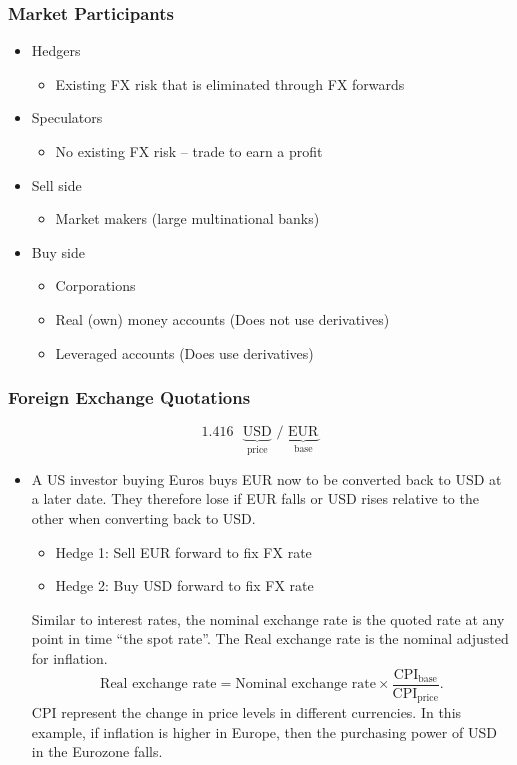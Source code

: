 \documentclass[../notes_compiled.tex]{subfiles}
\begin{document}
\subsubsection{Market Participants}
\begin{itemize}
\item Hedgers
\begin{itemize}
\item Existing FX risk that is eliminated through FX forwards
\end{itemize}
\item Speculators
\begin{itemize}
\item No existing FX risk -- trade to earn a profit
\end{itemize}
\item Sell side
\begin{itemize}
\item Market makers (large multinational banks)
\end{itemize}
\item Buy side
\begin{itemize}
\item Corporations
\item Real (own) money accounts (Does not use derivatives)
\item Leveraged accounts (Does use derivatives)
\end{itemize}
\end{itemize}

\subsubsection{Foreign Exchange Quotations}
\begin{equation*}
1.416 \text{ }\underbrace{\text{USD}}_{\text{price}} \text{ / } \underbrace{\text{EUR}}_{\text{base}}
\end{equation*}

\begin{itemize}
\item A US investor buying Euros buys EUR now to be converted back to USD at a later date. They therefore lose if EUR falls or USD rises relative to the other when converting back to USD.
\begin{itemize}
\item[] Hedge 1: Sell EUR forward to fix FX rate
\item[] Hedge 2: Buy USD forward to fix FX rate
\end{itemize}
Similar to interest rates, the nominal exchange rate is the quoted rate at any point in time ``the spot rate''. The Real exchange rate is the nominal adjusted for inflation.
\begin{equation}
\text{Real exchange rate} = \text{Nominal exchange rate} \times \frac{\text{CPI}_{\text{base}}}{\text{CPI}_{\text{price}}}.
\end{equation}
CPI represent the change in price levels in different currencies. In this example, if inflation is higher in Europe, then the purchasing power of USD in the Eurozone falls.
\end{itemize}
\end{document}
